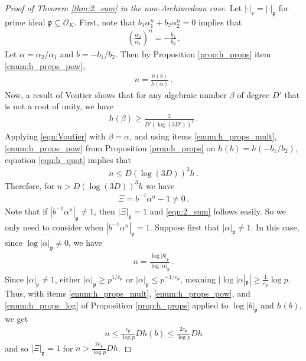 \documentclass{theoretics}
\newcommand{\p}{\mathfrak{p}}
\renewcommand{\O}{\mathcal{O}}
\begin{document}
\begin{proof}[Proof of Theorem \ref{thm:2_sum} in the non-Archimedean case]
Let $|\cdot|_v = |\cdot|_\p$ for prime ideal $\p \subseteq \O_K$. First, note that $b_1 \alpha_1^n + b_2 \alpha_2^n = 0$ implies that
\begin{align*}
\left( \frac{\alpha_2}{\alpha_1} \right)^n = -\frac{b_1}{b_2} \, .
\end{align*}
Let $\alpha = \alpha_2/\alpha_1$ and $b = -b_1/b_2$. Then by Proposition \ref{prop:h_props} item \ref{enum:h_props_pow},
\begin{align} \label{eqn:h_quot}
n = \frac{h( b )}{h ( \alpha )} \, .
\end{align}
Now, a result of Voutier \cite[Corollary 2]{PaulVoutier1996} shows that for any algebraic number $\beta$ of degree $D'$ that is not a root of unity, we have
\begin{align} \label{eqn:Voutier}
h(\beta) \geq \frac{2}{D'(\log(3D'))^3} \, .
\end{align}
Applying \eqref{eqn:Voutier} with $\beta = \alpha$, and using items \ref{enum:h_props_mult}, \ref{enum:h_props_pow} from Proposition \ref{prop:h_props} on $h(b) = h(-b_1/b_2)$, equation \eqref{eqn:h_quot} implies that
\begin{align*}
    n \leq D(\log(3D))^3h \, .
\end{align*}
Therefore, for $n > D(\log(3D))^3h$ we have
\begin{align*}
\Xi =  b^{-1}\alpha^n - 1 \neq 0 \, .
\end{align*}
Note that if $\left| b^{-1}\alpha^n \right|_\p \neq 1$, then $|\Xi|_\p = 1$ and \eqref{eqn:2_sum} follows easily. So we only need to consider when $\left|b^{-1}\alpha^n \right|_\p = 1$. Suppose first that $\left|\alpha \right|_\p \neq 1$. In this case, since $\log |\alpha|_\p \neq 0$, we have 
\begin{align*}
    n = \frac{\log \left| b \right|_\p}{\log |\alpha|_\p} \, .
\end{align*}
Since $|\alpha|_\p \neq 1$, either $|\alpha|_\p \geq p^{1/e_{\p}}$ or $|\alpha|_\p \leq p^{-1/e_{\p}}$, meaning $|\log |\alpha|_\p| \geq \frac{1}{e_{\p}} \log p$. Thus, with items \ref{enum:h_props_mult}, \ref{enum:h_props_pow}, and \ref{enum:h_props_log} of Proposition \ref{prop:h_props} applied to $\log|b|_\p$ and $h(b)$, we get
\begin{align*}
    n \leq \frac{e_{\p}}{\log p}D h(b) \leq \frac{2e_{\p}}{\log p} D h 
\end{align*}
and so $|\Xi|_\p = 1$ for $n > \frac{2e_{\p}}{\log p} D h $.


\end{proof}
\end{document}
